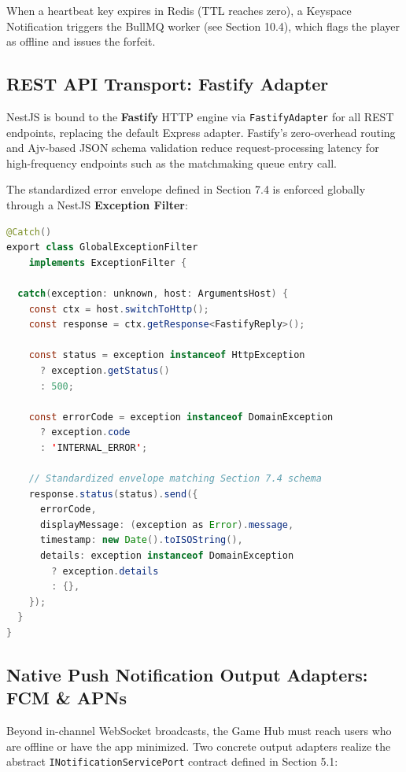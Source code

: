 \documentclass[11pt,a4paper]{report}
\begin{document}
When a heartbeat key expires in Redis (TTL reaches zero), a Keyspace Notification triggers the BullMQ worker (see Section 10.4), which flags the player as offline and issues the forfeit.

\subsection{REST API Transport: Fastify Adapter}

NestJS is bound to the \textbf{Fastify} HTTP engine via \texttt{FastifyAdapter} for all REST endpoints, replacing the default Express adapter. Fastify's zero-overhead routing and Ajv-based JSON schema validation reduce request-processing latency for high-frequency endpoints such as the matchmaking queue entry call.

The standardized error envelope defined in Section 7.4 is enforced globally through a NestJS \textbf{Exception Filter}:

\begin{lstlisting}[language=Java, caption={Global exception filter enforcing error envelope}]
@Catch()
export class GlobalExceptionFilter
    implements ExceptionFilter {

  catch(exception: unknown, host: ArgumentsHost) {
    const ctx = host.switchToHttp();
    const response = ctx.getResponse<FastifyReply>();

    const status = exception instanceof HttpException
      ? exception.getStatus()
      : 500;

    const errorCode = exception instanceof DomainException
      ? exception.code
      : 'INTERNAL_ERROR';

    // Standardized envelope matching Section 7.4 schema
    response.status(status).send({
      errorCode,
      displayMessage: (exception as Error).message,
      timestamp: new Date().toISOString(),
      details: exception instanceof DomainException
        ? exception.details
        : {},
    });
  }
}
\end{lstlisting}

\subsection{Native Push Notification Output Adapters: FCM \& APNs}

Beyond in-channel WebSocket broadcasts, the Game Hub must reach users who are offline or have the app minimized. Two concrete output adapters realize the abstract \texttt{INotificationServicePort} contract defined in Section 5.1:
\end{document}
